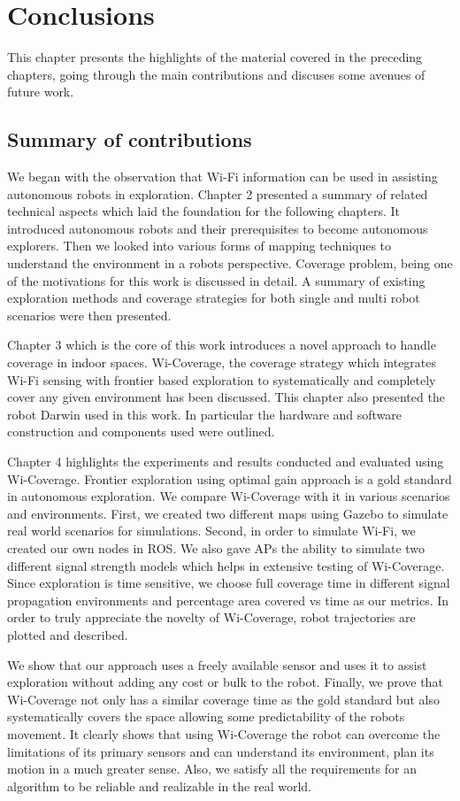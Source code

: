 \chapter{Conclusions}
This chapter presents the highlights of the material covered in the preceding chapters, going through the main contributions and discuses some avenues of future work.

\section{Summary of contributions}
We began with the observation that Wi-Fi information can be used in assisting autonomous robots in exploration. Chapter 2 presented a summary of related technical aspects which laid the foundation for the following chapters. It introduced autonomous robots and their prerequisites to become autonomous explorers. Then we looked into various forms of mapping techniques to understand the environment in a robots perspective. Coverage problem, being one of the motivations for this work is discussed in detail. A summary of existing exploration methods and coverage strategies for both single and multi robot scenarios were then presented.
\par Chapter 3 which is the core of this work introduces a novel approach to handle coverage in indoor spaces. Wi-Coverage, the coverage strategy which integrates Wi-Fi sensing with frontier based exploration to systematically and completely cover any given environment has been discussed. This chapter also presented the robot Darwin used in this work. In particular the hardware and software construction and components used were outlined.
\par Chapter 4 highlights the experiments and results conducted and evaluated using Wi-Coverage. Frontier exploration using optimal gain approach is a gold standard in autonomous exploration. We compare Wi-Coverage with it in various scenarios and environments. First, we created two different maps using Gazebo to simulate real world scenarios for simulations. Second, in order to simulate Wi-Fi, we created our own nodes in ROS. We also gave APs the ability to simulate two different signal strength models which helps in extensive testing of Wi-Coverage. Since exploration is time sensitive, we choose full coverage time in different signal propagation environments and percentage area covered vs time as our metrics. In order to truly appreciate the novelty of Wi-Coverage, robot trajectories are plotted and described. 
\par We show that our approach uses a freely available sensor and uses it to assist exploration without adding any cost or bulk to the robot. Finally, we prove that Wi-Coverage not only has a similar coverage time as the gold standard but also systematically covers the space allowing some predictability of the robots movement. It clearly shows that using Wi-Coverage the robot can overcome the limitations of its primary sensors and can understand its environment, plan its motion in a much greater sense. Also, we satisfy all the requirements for an algorithm to be reliable and realizable in the real world.
